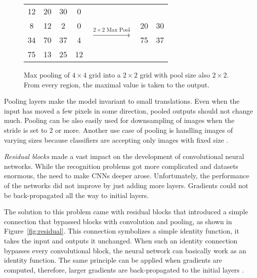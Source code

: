 \begin{figure}[!ht]
    \renewcommand{\arraystretch}{1.6}
    
    \centering
    \begin{tabular}{|c|c|c|c| c c c}
        \cline{1-4}
            \cellcolor{red!30}12 & \cellcolor{red!30}20 & \cellcolor{yellow!30}30 & \cellcolor{yellow!30}0 & & & \\ 
        \cline{1-4} \cline{6-7}
            \cellcolor{red!30}8 & \cellcolor{red!30}12 & \cellcolor{yellow!30}2 & \cellcolor{yellow!30}0 & \multirow{2}{*}{$\xrightarrow{2 \times 2 \text{ Max Pool}}$} & \multicolumn{1}{|c|}{\cellcolor{red!30}20} & \multicolumn{1}{c|}{\cellcolor{yellow!30}30} \\
        \cline{1-4} \cline{6-7}
            \cellcolor{blue!30}34 & \cellcolor{blue!30}70 & \cellcolor{green!30}37 & \cellcolor{green!30}4 & & \multicolumn{1}{|c|}{\cellcolor{blue!30}75} & \multicolumn{1}{c|}{\cellcolor{green!30}37} \\
        \cline{1-4} \cline{6-7}
            \cellcolor{blue!30}75 & \cellcolor{blue!30}13 & \cellcolor{green!30}25 & \cellcolor{green!30}12 & & & \\
        \cline{1-4}
    \end{tabular}
    \caption{Max pooling of $4 \times 4$ grid into a $2 \times 2$ grid with pool size also $2 \times 2$. From every region, the maximal value is taken to the output.}
    \label{fig:pooling}
\end{figure}

Pooling layers make the model invariant to small translations. Even when the input has moved a few pixels in some direction, pooled outputs should not change much. Pooling can be also easily used for downsampling of images when the stride is set to 2 or more. Another use case of pooling is handling images of varying sizes because classifiers are accepting only images with fixed size \cite{Goodfellow-et-al-2016}.

\textit{Residual blocks} made a vast impact on the development of convolutional neural networks. While the recognition problems got more complicated and datasets enormous, the need to make CNNs deeper arose. Unfortunately, the performance of the networks did not improve by just adding more layers. Gradients could not be back-propagated all the way to initial layers.

The solution to this problem came with residual blocks that introduced a simple connection that bypassed blocks with convolution and pooling, as shown in Figure~\ref{fig:residual}. This connection symbolizes a simple identity function, it takes the input and outputs it unchanged. When such an identity connection bypasses every convolutional block, the neural network can basically work as an identity function. The same principle can be applied when gradients are computed, therefore, larger gradients are back-propagated to the initial layers \cite{he2015deep-resnet}.

